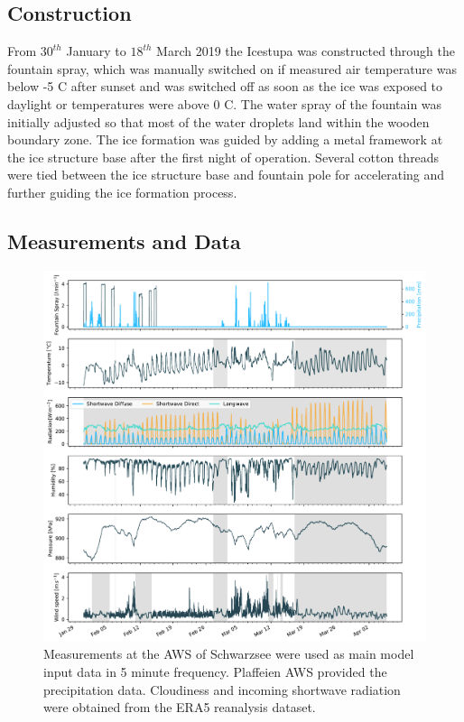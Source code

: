 \documentclass[utf8]{frontiersSCNS} %
\begin{document}
\subsection{Construction}
From $30^{th}$ January to $18^{th}$ March 2019 the Icestupa was constructed
through the fountain spray, which was manually switched on if measured air
temperature was below -5 \degree C after sunset and was switched off as soon
as the ice was exposed to daylight or temperatures were above 0 \degree C. The
water spray of the fountain was initially adjusted so that most of the water
droplets land within the wooden boundary zone. The ice formation was guided by
adding a metal framework at the ice structure base after the first night of
operation. Several cotton threads were tied between the ice structure base and
fountain pole for accelerating and further guiding the ice formation process. 

\subsection{Measurements and Data}

\begin{figure}[htpb]
    \centering
    \includegraphics[width=\linewidth]{./Figures/Figure_3}
  \caption{Measurements at the AWS of Schwarzsee were used as main model input data in 5 minute frequency. Plaffeien AWS provided the precipitation data. Cloudiness and incoming shortwave radiation were obtained from the ERA5 reanalysis dataset.}
    \label{fig:input}
\end{figure}
\end{document}
